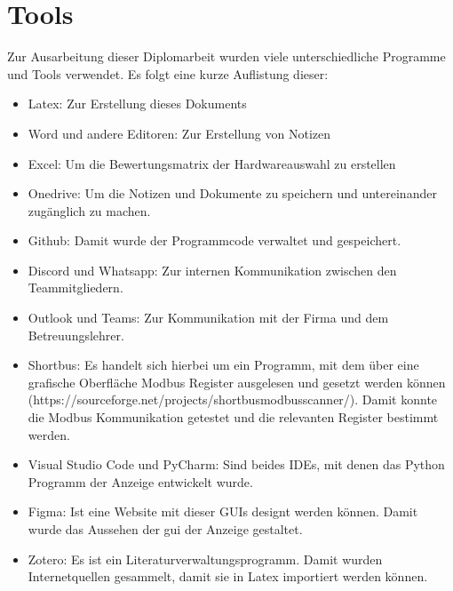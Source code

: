 \chapter{Tools}
Zur Ausarbeitung dieser Diplomarbeit wurden viele unterschiedliche Programme und Tools verwendet. Es folgt eine kurze Auflistung dieser:
\begin{itemize}
	\item Latex: Zur Erstellung dieses Dokuments
	\item Word und andere Editoren: Zur Erstellung von Notizen
	\item Excel: Um die Bewertungsmatrix der Hardwareauswahl zu erstellen
	\item Onedrive: Um die Notizen und Dokumente zu speichern und untereinander zugänglich zu machen.
	\item Github: Damit wurde der Programmcode verwaltet und gespeichert.
	\item Discord und Whatsapp: Zur internen Kommunikation zwischen den Teammitgliedern.
	\item Outlook und Teams: Zur Kommunikation mit der Firma und dem Betreuungslehrer.
	\item Shortbus: Es handelt sich hierbei um ein Programm, mit dem über eine grafische Oberfläche Modbus Register ausgelesen und gesetzt werden können (https://sourceforge.net/projects/shortbusmodbusscanner/). Damit konnte die Modbus Kommunikation getestet und die relevanten Register bestimmt werden.
	\item Visual Studio Code und PyCharm: Sind beides IDEs, mit denen das Python Programm der Anzeige entwickelt wurde.
	\item Figma: Ist eine Website mit dieser GUIs designt werden können. Damit wurde das Aussehen der \acs{gui} der Anzeige gestaltet.
	\item Zotero: Es ist ein Literaturverwaltungsprogramm. Damit wurden Internetquellen gesammelt, damit sie in Latex importiert werden können.
\end{itemize}
